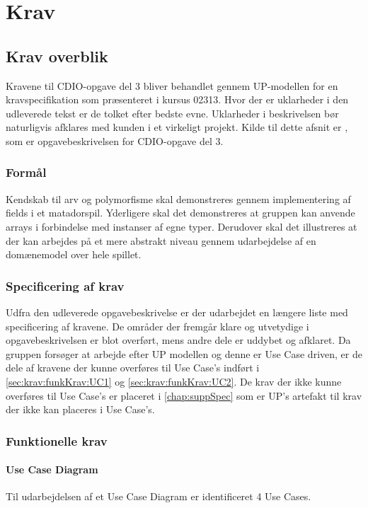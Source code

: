 \chapter{Krav}\label{chap:krav}

\section{Krav overblik}\label{sec:krav:kravOverblik}
Kravene til CDIO-opgave del 3 bliver behandlet gennem UP-modellen for en kravspecifikation som præsenteret i kursus 02313. Hvor der er uklarheder i den udleverede tekst er de tolket efter bedste evne. Uklarheder i beskrivelsen bør naturligvis afklares med kunden i et virkeligt projekt. Kilde til dette afsnit er \cite{CDIOdel3}, som er opgavebeskrivelsen for CDIO-opgave del 3.

\subsection{Formål}\label{sec:krav:formål}
Kendskab til arv og polymorfisme skal demonstreres gennem implementering af fields i et matadorspil. Yderligere skal det demonstreres at gruppen kan anvende arrays i forbindelse med instanser af egne typer. Derudover skal det illustreres at der kan arbejdes på et mere abstrakt niveau gennem udarbejdelse af en domænemodel over hele spillet. 

\subsection{Specificering af krav}\label{sec:krav:kravSpec}
Udfra den udleverede opgavebeskrivelse \cite{CDIOdel3} er der udarbejdet en længere liste med specificering af kravene. De områder der fremgår klare og utvetydige i opgavebeskrivelsen er blot overført, mens andre dele er uddybet og afklaret. Da gruppen forsøger at arbejde efter UP modellen og denne er Use Case driven, er de dele af kravene der kunne overføres til Use Case's indført i \ref{sec:krav:funkKrav:UC1} og \ref{sec:krav:funkKrav:UC2}. De krav der ikke kunne overføres til Use Case's er placeret i \ref{chap:suppSpec} som er UP's artefakt til krav der ikke kan placeres i Use Case's.
 
\subsection{Funktionelle krav}\label{sec:krav:funkKrav}
\subsubsection{Use Case Diagram}\label{sec:krav:funkKrav:useCaseDia}
Til udarbejdelsen af et Use Case Diagram er identificeret 4 Use Cases. 

